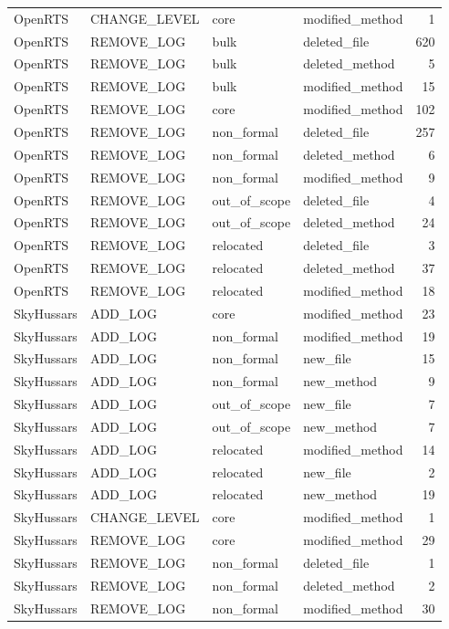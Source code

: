 {\begin{longtable}{llllr}
OpenRTS & CHANGE\_LEVEL & core & modified\_method & 1 \\
OpenRTS & REMOVE\_LOG & bulk & deleted\_file & 620 \\
OpenRTS & REMOVE\_LOG & bulk & deleted\_method & 5 \\
OpenRTS & REMOVE\_LOG & bulk & modified\_method & 15 \\
OpenRTS & REMOVE\_LOG & core & modified\_method & 102 \\
OpenRTS & REMOVE\_LOG & non\_formal & deleted\_file & 257 \\
OpenRTS & REMOVE\_LOG & non\_formal & deleted\_method & 6 \\
OpenRTS & REMOVE\_LOG & non\_formal & modified\_method & 9 \\
OpenRTS & REMOVE\_LOG & out\_of\_scope & deleted\_file & 4 \\
OpenRTS & REMOVE\_LOG & out\_of\_scope & deleted\_method & 24 \\
OpenRTS & REMOVE\_LOG & relocated & deleted\_file & 3 \\
OpenRTS & REMOVE\_LOG & relocated & deleted\_method & 37 \\
OpenRTS & REMOVE\_LOG & relocated & modified\_method & 18 \\
SkyHussars & ADD\_LOG & core & modified\_method & 23 \\
SkyHussars & ADD\_LOG & non\_formal & modified\_method & 19 \\
SkyHussars & ADD\_LOG & non\_formal & new\_file & 15 \\
SkyHussars & ADD\_LOG & non\_formal & new\_method & 9 \\
SkyHussars & ADD\_LOG & out\_of\_scope & new\_file & 7 \\
SkyHussars & ADD\_LOG & out\_of\_scope & new\_method & 7 \\
SkyHussars & ADD\_LOG & relocated & modified\_method & 14 \\
SkyHussars & ADD\_LOG & relocated & new\_file & 2 \\
SkyHussars & ADD\_LOG & relocated & new\_method & 19 \\
SkyHussars & CHANGE\_LEVEL & core & modified\_method & 1 \\
SkyHussars & REMOVE\_LOG & core & modified\_method & 29 \\
SkyHussars & REMOVE\_LOG & non\_formal & deleted\_file & 1 \\
SkyHussars & REMOVE\_LOG & non\_formal & deleted\_method & 2 \\
SkyHussars & REMOVE\_LOG & non\_formal & modified\_method & 30 \\

\end{longtable}}

